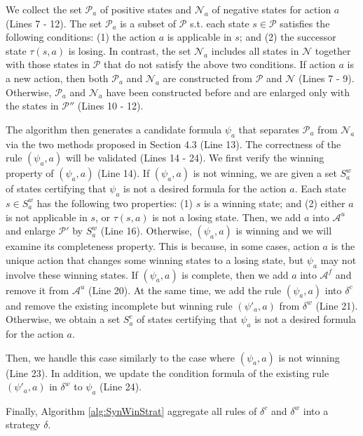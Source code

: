 \documentclass[review]{elsarticle}
\newcommand{\positiveSet}{\mathcal{P}}
\newcommand{\negativeSet}{\mathcal{N}}
\newcommand{\act}{\mathcal{A}}
\newcommand{\suc}{\tau}
\begin{document}
We collect the set $\positiveSet_a$ of positive states and $\negativeSet_a$ of negative states for action $a$ (Lines 7 - 12).
The set $\positiveSet_a$ is a subset of $\positiveSet$ s.t. each state $s \in \positiveSet$ satisfies the following conditions: (1) the action $a$ is applicable in $s$; and
(2) the successor state $\suc(s, a)$ is losing.
In contrast, the set $\negativeSet_a$ includes all states in $\negativeSet$ together with those states in $\positiveSet$ that do not satisfy the above two conditions.
If action $a$ is a new action, then both $\positiveSet_a$ and $\negativeSet_a$ are constructed from $\positiveSet$ and $\negativeSet$ (Lines 7 - 9).
Otherwise, $\positiveSet_a$ and $\negativeSet_a$ have been constructed before and are enlarged only with the states in $\positiveSet''$ (Lines 10 - 12).


The algorithm then generates a candidate formula $\psi_a$ that separates $\positiveSet_a$ from $\negativeSet_a$ via the two methods proposed in Section 4.3 (Line 13).
The correctness of the rule $(\psi_a, a)$ will be validated (Lines 14 - 24).
We first verify the winning property of $(\psi_a, a)$ (Line 14).
If $(\psi_a, a)$ is not winning, we are given a set $S^w_a$ of states certifying that $\psi_a$ is not a desired formula for the action $a$.
Each state $s \in S^w_a$ has the following two properties:
(1) $s$ is a winning state; and
(2) either $a$ is not applicable in $s$, or $\suc(s, a)$ is not a losing state.
Then, we add $a$ into $\act^u$ and enlarge $\positiveSet'$ by $S^w_a$ (Line 16).
Otherwise, $(\psi_a, a)$ is winning and we will examine its completeness property.
This is because, in some cases, action $a$ is the unique action that changes some winning states to a losing state, but $\psi_a$ may not involve these winning states.
If $(\psi_a, a)$ is complete, then we add $a$ into $\act^f$ and remove it from $\act^u$ (Line 20).
At the same time, we add the rule $(\psi_a, a)$ into $\delta^c$ and remove the existing incomplete but winning rule $(\psi'_a, a)$ from $\delta^w$ (Line 21).
Otherwise, we obtain a set $S^c_a$ of states certifying that $\psi_a$ is not a desired formula for the action $a$.


Then, we handle this case similarly to the case where $(\psi_a, a)$ is not winning (Line 23).
In addition, we update the condition formula of the existing rule $(\psi'_a, a)$ in $\delta^w$ to $\psi_a$ (Line 24).



Finally, Algorithm \ref{alg:SynWinStrat} aggregate all rules of $\delta^c$ and $\delta^w$ into a strategy $\delta$. 
\end{document}
